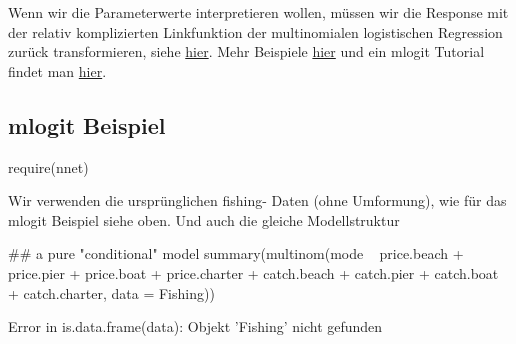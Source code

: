 \documentclass[a4paper,twoside]{tufte-book}\usepackage[]{graphicx}\usepackage[]{color}
\begin{document}
\begin{appendices}
Wenn wir die Parameterwerte interpretieren wollen, müssen wir die Response mit der relativ komplizierten Linkfunktion der multinomialen logistischen Regression zurück transformieren, siehe \href{http://en.wikipedia.org/wiki/Multinomial_logistic_regression}{hier}. Mehr Beispiele \href{http://www.inside-r.org/packages/cran/mlogit/docs/suml}{hier} und ein mlogit Tutorial findet man \href{http://cran.r-project.org/web/packages/mlogit/vignettes/Exercises.pdf}{hier}.

\subsection{mlogit Beispiel}

\begin{Schunk}
\begin{Sinput}
require(nnet)
\end{Sinput}
\end{Schunk}

Wir verwenden die ursprünglichen fishing- Daten (ohne Umformung), wie für das mlogit Beispiel siehe oben.
Und auch die gleiche Modellstruktur

\begin{Schunk}
\begin{Sinput}
## a pure "conditional" model
summary(multinom(mode ~ price.beach + price.pier + price.boat + price.charter + 
                   catch.beach + catch.pier + catch.boat + catch.charter, data = Fishing))
\end{Sinput}
\begin{Soutput}
Error in is.data.frame(data): Objekt 'Fishing' nicht gefunden
\end{Soutput}
\end{Schunk}
\end{appendices}


 
\end{document}
